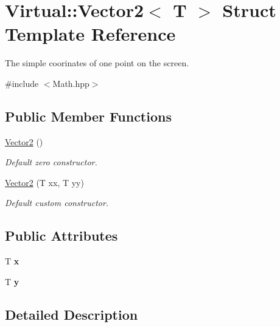 \hypertarget{struct_virtual_1_1_vector2}{}\section{Virtual\+:\+:Vector2$<$ T $>$ Struct Template Reference}
\label{struct_virtual_1_1_vector2}


The simple coorinates of one point on the screen.  




{\ttfamily \#include $<$Math.\+hpp$>$}

\subsection*{Public Member Functions}
\begin{DoxyCompactItemize}
\item 
\hyperlink{struct_virtual_1_1_vector2_add372f623a2a5c19f1f20f491cf7001c}{Vector2} ()
\begin{DoxyCompactList}\small\item\em Default zero constructor. \end{DoxyCompactList}\item 
\hyperlink{struct_virtual_1_1_vector2_a5debf297b5880d21e4ee0748dc620160}{Vector2} (T xx, T yy)
\begin{DoxyCompactList}\small\item\em Default custom constructor. \end{DoxyCompactList}\end{DoxyCompactItemize}
\subsection*{Public Attributes}
\begin{DoxyCompactItemize}
\item 
\hypertarget{struct_virtual_1_1_vector2_a919a8ee5d1a3cdd8bddef88b02892cda}{}\label{struct_virtual_1_1_vector2_a919a8ee5d1a3cdd8bddef88b02892cda} 
T {\bfseries x}
\item 
\hypertarget{struct_virtual_1_1_vector2_a88e297ba93191d0d797a0c32c1f08d0f}{}\label{struct_virtual_1_1_vector2_a88e297ba93191d0d797a0c32c1f08d0f} 
T {\bfseries y}
\end{DoxyCompactItemize}


\subsection{Detailed Description}
